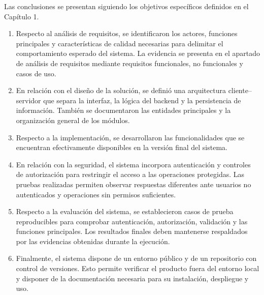 Las conclusiones se presentan siguiendo los objetivos específicos definidos
en el Capítulo 1.

\begin{enumerate}
	
	\item
	Respecto al análisis de requisitos, se identificaron los actores, funciones
	principales y características de calidad necesarias para delimitar el
	comportamiento esperado del sistema. La evidencia se presenta en el
	apartado de análisis de requisitos mediante requisitos funcionales, no
	funcionales y casos de uso.
	
	\item
	En relación con el diseño de la solución, se definió una arquitectura
	cliente--servidor que separa la interfaz, la lógica del backend y la
	persistencia de información. También se documentaron las entidades
	principales y la organización general de los módulos.
	
	\item
	Respecto a la implementación, se desarrollaron las funcionalidades que se
	encuentran efectivamente disponibles en la versión final del sistema.
	
	
	\item
	En relación con la seguridad, el sistema incorpora autenticación y controles
	de autorización para restringir el acceso a las operaciones protegidas.
	Las pruebas realizadas permiten observar respuestas diferentes ante
	usuarios no autenticados y operaciones sin permisos suficientes.
	
	\item
	Respecto a la evaluación del sistema, se establecieron casos de prueba
	reproducibles para comprobar autenticación, autorización, validación y las
	funciones principales. Los resultados finales deben mantenerse respaldados
	por las evidencias obtenidas durante la ejecución.
	
	\item
	Finalmente, el sistema dispone de un entorno público y de un repositorio con
	control de versiones. Esto permite verificar el producto fuera del entorno
	local y disponer de la documentación necesaria para su instalación,
	despliegue y uso.
	
\end{enumerate}



